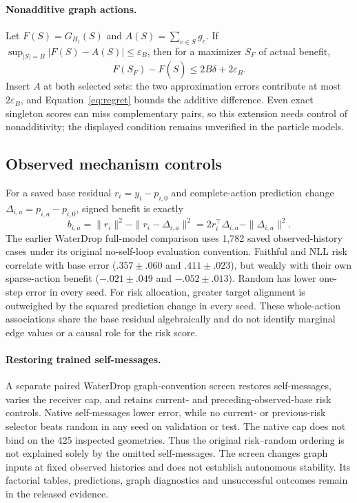 \paragraph{Nonadditive graph actions.}\label{sec:nonadditive-allocation}
Let $F(S)=G_{H_t}(S)$ and $A(S)=\sum_{e\in S}g_e$. If
$\sup_{|S|=B}|F(S)-A(S)|\le\varepsilon_B$, then for a maximizer $S_F$ of actual benefit,
\begin{equation}
 F(S_F)-F(\widehat S)\le2B\delta+2\varepsilon_B.
 \label{eq:nonadditive-regret}
\end{equation}
Insert $A$ at both selected sets: the two approximation errors contribute at most $2\varepsilon_B$, and Equation~\ref{eq:regret} bounds the additive difference. Even exact singleton scores can miss complementary pairs, so this extension needs control of nonadditivity; the displayed condition remains unverified in the particle models.

\subsection{Observed mechanism controls}
\label{sec:actual-action-benefit}
For a saved base residual $r_i=y_i-p_{i,0}$ and complete-action prediction change $\Delta_{i,a}=p_{i,a}-p_{i,0}$, signed benefit is exactly
\begin{equation}
 b_{i,a}=\|r_i\|^2-\|r_i-\Delta_{i,a}\|^2
        =2r_i^\top\Delta_{i,a}-\|\Delta_{i,a}\|^2.
\end{equation}
The earlier WaterDrop full-model comparison uses 1,782 saved observed-history cases under its original no-self-loop evaluation convention. Faithful and NLL risk correlate with base error ($.357\pm.060$ and $.411\pm.023$), but weakly with their own sparse-action benefit ($-.021\pm.049$ and $-.052\pm.013$). Random has lower one-step error in every seed. For risk allocation, greater target alignment is outweighed by the squared prediction change in every seed. These whole-action associations share the base residual algebraically and do not identify marginal edge values or a causal role for the risk score.

\paragraph{Restoring trained self-messages.}\label{sec:graph-bridge}
A separate paired WaterDrop graph-convention screen restores self-messages, varies the receiver cap, and retains current- and preceding-observed-base risk controls. Native self-messages lower error, while no current- or previous-risk selector beats random in any seed on validation or test. The native cap does not bind on the 425 inspected geometries. Thus the original risk--random ordering is not explained solely by the omitted self-messages. The screen changes graph inputs at fixed observed histories and does not establish autonomous stability. Its factorial tables, predictions, graph diagnostics and unsuccessful outcomes remain in the released evidence.


